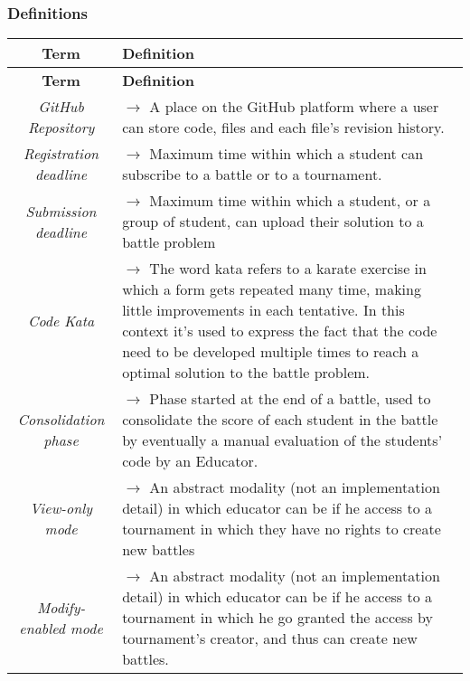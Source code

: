 \documentclass{article}
\begin{document}
    \subsubsection{Definitions}
        {\renewcommand{\arraystretch}{1.5}%
            \begin{xltabular}{\textwidth}{ >{\raggedright\arraybackslash}c >{\raggedright\arraybackslash}X }
                \hline 
                \textbf{Term} & \textbf{Definition} \\
                \hline 
                
                \endfirsthead

                \hline 
                \textbf{Term} & \textbf{Definition} \\
                \hline 

                \endhead
                \endfoot
                \endlastfoot
    
                \textit{GitHub Repository} & $\rightarrow$ A place on the GitHub platform where a user can store code, files and each file's revision history. \\
                \textit{Registration deadline} & $\rightarrow$ Maximum time within which a student can subscribe to a battle or to a tournament. \\
                \textit{Submission deadline} & $\rightarrow$ Maximum time within which a student, or a group of student, can upload their solution to a battle problem \\
                \textit{Code Kata} & $\rightarrow$ The word kata refers to a karate exercise in which a form gets repeated many time, making little improvements in each tentative.
                In this context it's used to express the fact that the code need to be developed multiple times to reach a optimal solution to the battle problem. \\
                \textit{Consolidation phase} & $\rightarrow$ Phase started at the end of a battle, used to consolidate the score of each student in the battle by eventually a manual evaluation of the students' code by an Educator. \\
                \textit{View-only mode} & $\rightarrow$ An abstract modality (not an implementation detail) in which educator can be if he access to a tournament in which they have no rights to create new battles \\
                \textit{Modify-enabled mode }& $\rightarrow$ An abstract modality (not an implementation detail) in which educator can be if he access to a tournament in which he go granted the access by tournament's creator, and thus can create new battles.
            \end{xltabular}
    
}
\end{document}
